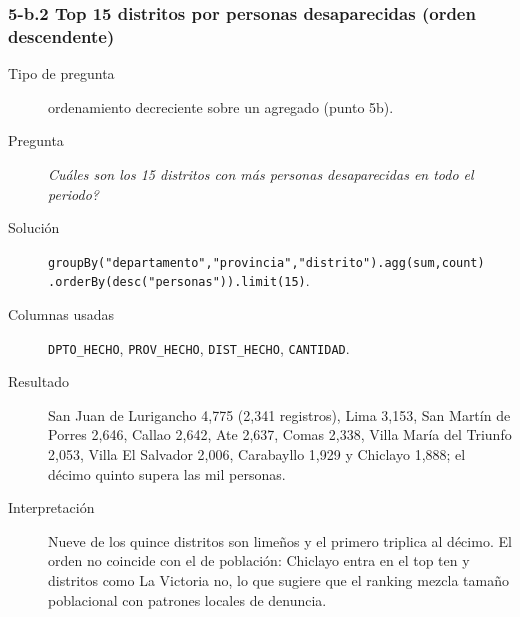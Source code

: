\subsubsection*{5-b.2 \textbar{} Top 15 distritos por personas desaparecidas (orden descendente)}
\begin{description}
\item[Tipo de pregunta] ordenamiento decreciente sobre un agregado (punto 5b).
\item[Pregunta] \emph{Cu\'ales son los 15 distritos con m\'as personas desaparecidas en todo el
      periodo?}
\item[Soluci\'on] \texttt{groupBy("departamento","provincia","distrito").agg(sum,count)
      .orderBy(desc("personas")).limit(15)}.
\item[Columnas usadas] \texttt{DPTO\_HECHO}, \texttt{PROV\_HECHO}, \texttt{DIST\_HECHO},
      \texttt{CANTIDAD}.
\item[Resultado] San Juan de Lurigancho 4,775 (2,341 registros), Lima 3,153, San Mart\'in de
      Porres 2,646, Callao 2,642, Ate 2,637, Comas 2,338, Villa Mar\'ia del Triunfo 2,053,
      Villa El Salvador 2,006, Carabayllo 1,929 y Chiclayo 1,888; el d\'ecimo quinto supera las
      mil personas.
\item[Interpretaci\'on] Nueve de los quince distritos son lime\~nos y el primero triplica al
      d\'ecimo. El orden no coincide con el de poblaci\'on: Chiclayo entra en el top ten y
      distritos como La Victoria no, lo que sugiere que el ranking mezcla tama\~no poblacional
      con patrones locales de denuncia.
\end{description}

